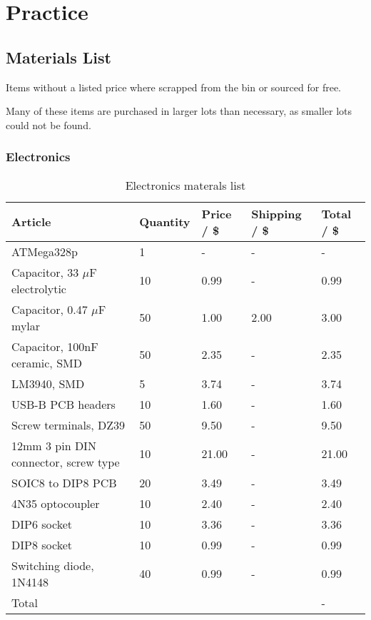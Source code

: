 \documentclass[11pt,fleqn,openany]{book} %
\begin{document}

\part{Practice}



\chapter{Materials List}

Items without a listed price where scrapped from the bin or sourced for free.

Many of these items are purchased in larger lots than necessary, as smaller lots could not be found.

\section{Electronics}

\begin{table}[ht!]
\centering
\begin{tabular}{l l l l l}
\toprule
Article & Quantity & Price / \$ & Shipping / \$ & Total / \$\\
\midrule
ATMega328p & 1 & - & - & - \\
Capacitor, 33 $\mu$F electrolytic & 10 & 0.99 & - & 0.99 \\
Capacitor, 0.47 $\mu$F mylar & 50 & 1.00 & 2.00 & 3.00 \\
Capacitor, 100nF ceramic, SMD & 50 & 2.35 & - & 2.35 \\
LM3940, SMD & 5 & 3.74 & - & 3.74 \\
USB-B PCB headers & 10 & 1.60 & - & 1.60 \\
Screw terminals, DZ39 & 50 & 9.50 & - & 9.50 \\
12mm 3 pin DIN connector, screw type & 10 & 21.00 & - & 21.00 \\
SOIC8 to DIP8 PCB & 20 & 3.49 & - & 3.49 \\
4N35 optocoupler & 10 & 2.40 & - & 2.40 \\
DIP6 socket & 10 & 3.36 & - & 3.36 \\
DIP8 socket & 10 & 0.99 & - & 0.99 \\
Switching diode, 1N4148 & 40 & 0.99 & - & 0.99 \\
\bottomrule
Total & & & & -\\
\end{tabular}
\caption{Electronics materals list}
\end{table}
\end{document}
